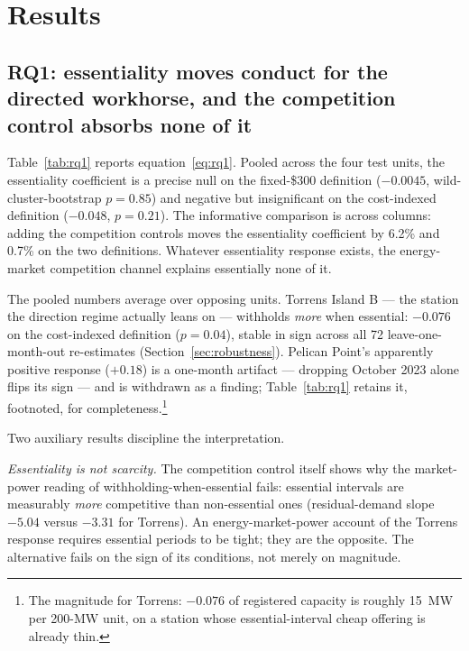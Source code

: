 \section{Results}\label{sec:results}

\subsection{RQ1: essentiality moves conduct for the directed workhorse, and the
competition control absorbs none of it}

Table~\ref{tab:rq1} reports equation~\eqref{eq:rq1}. Pooled across the four
test units, the essentiality coefficient is a precise null on the fixed-\$300
definition ($-0.0045$, wild-cluster-bootstrap $p=0.85$) and negative but
insignificant on the cost-indexed definition ($-0.048$, $p=0.21$). The informative
comparison is across columns: adding the competition controls moves the
essentiality coefficient by 6.2\% and 0.7\% on the two definitions.
Whatever essentiality response exists, the energy-market competition channel
explains essentially none of it.

The pooled numbers average over opposing units. Torrens Island B --- the
station the direction regime actually leans on --- withholds \emph{more} when
essential: $-0.076$ on the cost-indexed definition ($p=0.04$), stable in sign
across all 72 leave-one-month-out re-estimates
(Section~\ref{sec:robustness}). Pelican Point's apparently positive response
($+0.18$) is a one-month artifact --- dropping October 2023 alone flips its
sign --- and is withdrawn as a finding; Table~\ref{tab:rq1} retains it,
footnoted, for completeness.\footnote{The magnitude for Torrens: $-0.076$ of
registered capacity is roughly 15~MW per 200-MW unit, on a station whose
essential-interval cheap offering is already thin.}

Two auxiliary results discipline the interpretation.

\emph{Essentiality is not scarcity.} The competition control itself shows why
the market-power reading of withholding-when-essential fails: essential
intervals are measurably \emph{more} competitive than non-essential ones
(residual-demand slope $-5.04$ versus $-3.31$ for Torrens). An
energy-market-power account of the Torrens response requires essential
periods to be tight;
they are the opposite. The alternative fails on the sign of its conditions,
not merely on magnitude.

